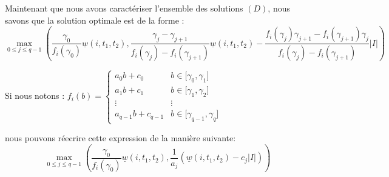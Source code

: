 \documentclass{report}
\newcommand{\wb}{\underline{w}(i,t_1,t_2)}
\newcommand{\inter}[2]{{[}#1,#2{]}}
\newcommand{\ga}{\gamma}
\begin{document}
Maintenant que nous avons caractériser l'ensemble des solutions $(D)$, nous 
savons que la solution optimale est de la forme :
	\[ \max_{0\le j\le q-1} \left(
	\frac{\ga_0}{f_i(\ga_0)}\wb ,
	\frac{\ga_j - \ga_{j+1}}{f_i(\ga_j)-f_i(\ga_{j+1})} \wb -
	\frac{f_i(\ga_j)\ga_{j+1} - f_i(\ga_{j+1})\ga_j}
	{f_i(\ga_j)-f_i(\ga_{j+1})}|I|
	\right)
	\]
	
Si nous notons :
	$f_i(b)= \left\{ 
	\begin{array}{cc}
	a_0b+c_0 & b \in \inter{\ga_0}{\ga_1}\\
	a_1b+c_1 & b \in \inter{\ga_1}{\ga_2}\\
	\vdots & \vdots \\
	a_{q-1}b+c_{q-1} & b \in \inter{\ga_{q-1}}{\ga_q}
	\end{array}
	\right.
	$

nous pouvons réecrire cette expression de la manière suivante:
	\[ \max_{0 \le j\le q-1} \left(
	\frac{\ga_0}{f_i(\ga_0)}\wb ,
	\frac{1}{a_j}(\wb -c_j|I|)
	\right)
	\]
\end{document}

